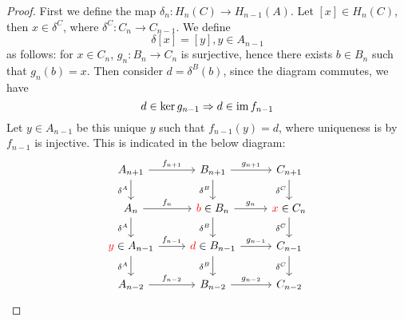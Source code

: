 \begin{proof}
    First we define the map $\delta_n: H_n(C)\to H_{n-1}(A)$. Let $[x]\in H_n(C)$, then $x\in\delta^C$, where $\delta^C:C_n\to C_{n-1}$. We define 
    \begin{equation*}
        \delta[x]=[y], y\in A_{n-1}
    \end{equation*}
    as follows: for $x\in C_n$, $g_n: B_n\to C_n$ is surjective, hence there exists $b\in B_n$ such that $g_n(b)=x$. Then consider $d=\delta^B(b)$, since the diagram commutes, we have 
    \begin{equation*}
        d\in\ker g_{n-1}\Rightarrow d\in\operatorname{im} f_{n-1}
    \end{equation*}
    Let $y\in A_{n-1}$ be this unique $y$ such that $f_{n-1}(y)=d$, where uniqueness is by $f_{n-1}$ is injective. This is indicated in the below diagram:
    \[\begin{tikzcd}
        {A_{n+1}} & {B_{n+1}} & {C_{n+1}} \\
        {A_n} & {\textcolor{red}{b}\in B_n} & {\textcolor{red}{x}\in C_n} \\
        {\textcolor{red}{y}\in A_{n-1}} & {\textcolor{red}{d}\in B_{n-1}} & {C_{n-1}} \\
        {A_{n-2}} & {B_{n-2}} & {C_{n-2}}
        \arrow["{f_{n+1}}", from=1-1, to=1-2]
        \arrow["{\delta^A}"', from=1-1, to=2-1]
        \arrow["{g_{n+1}}", from=1-2, to=1-3]
        \arrow["{\delta^B}"', from=1-2, to=2-2]
        \arrow["{\delta^C}"', from=1-3, to=2-3]
        \arrow["{f_n}", from=2-1, to=2-2]
        \arrow["{\delta^A}"', from=2-1, to=3-1]
        \arrow["{g_n}", from=2-2, to=2-3]
        \arrow["{\delta^B}"', from=2-2, to=3-2]
        \arrow["{\delta^C}"', from=2-3, to=3-3]
        \arrow["{f_{n-1}}", from=3-1, to=3-2]
        \arrow["{\delta^A}"', from=3-1, to=4-1]
        \arrow["{g_{n-1}}", from=3-2, to=3-3]
        \arrow["{\delta^B}"', from=3-2, to=4-2]
        \arrow["{\delta^C}"', from=3-3, to=4-3]
        \arrow["{f_{n-2}}", from=4-1, to=4-2]
        \arrow["{g_{n-2}}", from=4-2, to=4-3]
    \end{tikzcd}\]


\end{proof}
